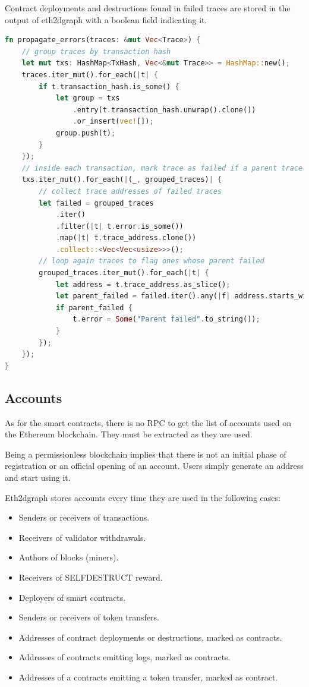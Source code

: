 Contract deployments and destructions found in failed traces are stored in the output of eth2dgraph with a boolean field indicating it.

\begin{lstlisting}[language=Rust,caption={Algorithm for errors propagation in traces.},label={lst:error-propagation},captionpos=b, style=boxed]
fn propagate_errors(traces: &mut Vec<Trace>) {
    // group traces by transaction hash
    let mut txs: HashMap<TxHash, Vec<&mut Trace>> = HashMap::new();
    traces.iter_mut().for_each(|t| {
        if t.transaction_hash.is_some() {
            let group = txs
                .entry(t.transaction_hash.unwrap().clone())
                .or_insert(vec![]);
            group.push(t);
        }
    });
    // inside each transaction, mark trace as failed if a parent trace has failed
    txs.iter_mut().for_each(|(_, grouped_traces)| {
        // collect trace addresses of failed traces
        let failed = grouped_traces
            .iter()
            .filter(|t| t.error.is_some())
            .map(|t| t.trace_address.clone())
            .collect::<Vec<Vec<usize>>>();
        // loop again traces to flag ones whose parent failed
        grouped_traces.iter_mut().for_each(|t| {
            let address = t.trace_address.as_slice();
            let parent_failed = failed.iter().any(|f| address.starts_with(f));
            if parent_failed {
                t.error = Some("Parent failed".to_string());
            }
        });
    });
}
\end{lstlisting}

\subsection{Accounts}

As for the smart contracts, there is no RPC to get the list of accounts used on the Ethereum blockchain. They must be extracted as they are used.

Being a permissionless blockchain implies that there is not an initial phase of registration or an official opening of an account. Users simply generate an address and start using it. 

Eth2dgraph stores accounts every time they are used in the following cases:

\begin{itemize}
    \item Senders or receivers of transactions.
    \item Receivers of validator withdrawals.
    \item Authors of blocks (miners).
    \item Receivers of SELFDESTRUCT reward.
    \item Deployers of smart contracts.
    \item Senders or receivers of token transfers.
    \item Addresses of contract deployments or destructions, marked as contracts.
    \item Addresses of contracts emitting logs, marked as contracts.
    \item Addresses of a contracts emitting a token transfer, marked as contract.
\end{itemize}

